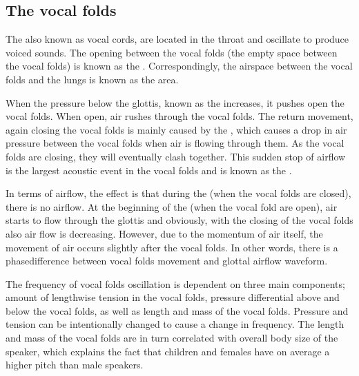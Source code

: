 \documentclass[letterpaper,10pt,english]{jupyterBook}
\begin{document}
\subsection{The vocal folds}
\label{\detokenize{Introduction/Speech_production_and_acoustic_properties:the-vocal-folds}}
\sphinxAtStartPar
The  also known as vocal cords, are located in the throat
and oscillate to produce voiced sounds. The opening between the vocal
folds (the empty space between the vocal folds) is known as the
. Correspondingly, the airspace between the vocal folds and the
lungs is known as the  area.

\sphinxAtStartPar
When the pressure below the glottis, known as the 
increases, it pushes open the vocal folds. When open, air rushes through
the vocal folds. The return movement, again closing the vocal folds is
mainly caused by the , which causes a
drop in air pressure between the vocal folds when air is flowing through
them. As the vocal folds are closing, they will eventually clash
together. This sudden stop of airflow is the largest acoustic event in
the vocal folds and is known as the .

\sphinxAtStartPar
In terms of airflow, the effect is that during the  (when
the vocal folds are closed), there is no airflow. At the beginning of
the  (when the vocal fold are open), air starts to flow
through the glottis and obviously, with the closing of the vocal folds
also air flow is decreasing. However, due to the momentum of air itself,
the movement of air occurs slightly after the vocal folds. In other
words, there is a phase\sphinxhyphen{}difference between vocal folds movement and
glottal airflow waveform.

\sphinxAtStartPar
The frequency of vocal folds oscillation is dependent on three main
components; amount of lengthwise tension in the vocal folds, pressure
differential above and below the vocal folds, as well as length and mass
of the vocal folds. Pressure and tension can be intentionally changed to
cause a change in frequency. The length and mass of the vocal folds are
in turn correlated with overall body size of the speaker, which explains
the fact that children and females have on average a higher pitch than
male speakers.
\end{document}

